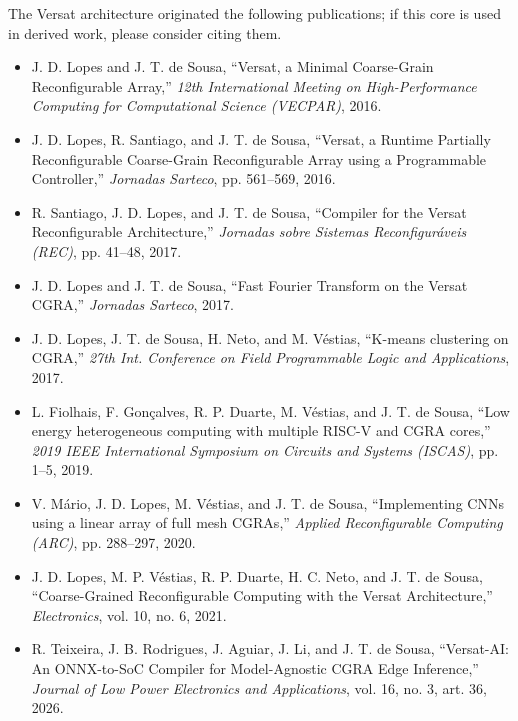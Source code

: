 %

The Versat architecture originated the following publications; if this
core is used in derived work, please consider citing them.

\begin{itemize}
  \itemsep-0.5em
  \item J. D. Lopes and J. T. de Sousa, ``Versat, a Minimal Coarse-Grain
    Reconfigurable Array,'' \emph{12th International Meeting on
    High-Performance Computing for Computational Science (VECPAR)}, 2016.
  \item J. D. Lopes, R. Santiago, and J. T. de Sousa, ``Versat, a Runtime
    Partially Reconfigurable Coarse-Grain Reconfigurable Array using a
    Programmable Controller,'' \emph{Jornadas Sarteco}, pp. 561--569, 2016.
  \item R. Santiago, J. D. Lopes, and J. T. de Sousa, ``Compiler for the
    Versat Reconfigurable Architecture,'' \emph{Jornadas sobre Sistemas
    Reconfigur\'aveis (REC)}, pp. 41--48, 2017.
  \item J. D. Lopes and J. T. de Sousa, ``Fast Fourier Transform on the
    Versat CGRA,'' \emph{Jornadas Sarteco}, 2017.
  \item J. D. Lopes, J. T. de Sousa, H. Neto, and M. V\'estias, ``K-means
    clustering on CGRA,'' \emph{27th Int. Conference on Field Programmable
    Logic and Applications}, 2017.
  \item L. Fiolhais, F. Gon\c{c}alves, R. P. Duarte, M. V\'estias, and J. T.
    de Sousa, ``Low energy heterogeneous computing with multiple RISC-V and
    CGRA cores,'' \emph{2019 IEEE International Symposium on Circuits and
    Systems (ISCAS)}, pp. 1--5, 2019.
  \item V. M\'ario, J. D. Lopes, M. V\'estias, and J. T. de Sousa,
    ``Implementing CNNs using a linear array of full mesh CGRAs,''
    \emph{Applied Reconfigurable Computing (ARC)}, pp. 288--297, 2020.
  \item J. D. Lopes, M. P. V\'estias, R. P. Duarte, H. C. Neto, and J. T. de
    Sousa, ``Coarse-Grained Reconfigurable Computing with the Versat
    Architecture,'' \emph{Electronics}, vol. 10, no. 6, 2021.
  \item R. Teixeira, J. B. Rodrigues, J. Aguiar, J. Li, and J. T. de Sousa,
    ``Versat-AI: An ONNX-to-SoC Compiler for Model-Agnostic CGRA Edge
    Inference,'' \emph{Journal of Low Power Electronics and Applications},
    vol. 16, no. 3, art. 36, 2026.
\end{itemize}
